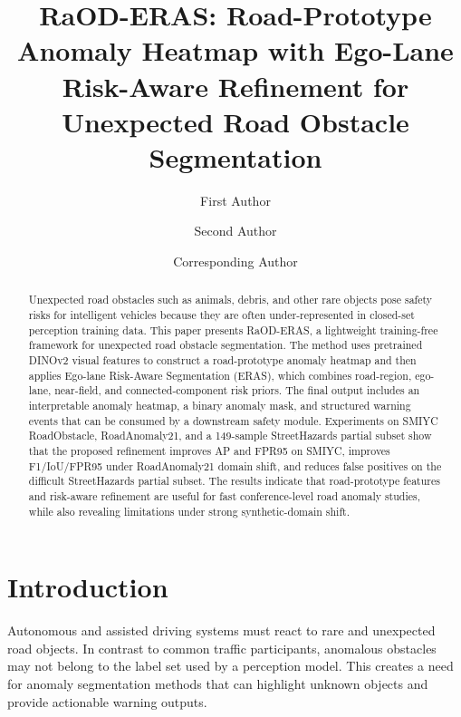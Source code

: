 \documentclass[runningheads]{llncs}
\begin{document}
\title{RaOD-ERAS: Road-Prototype Anomaly Heatmap with Ego-Lane Risk-Aware Refinement for Unexpected Road Obstacle Segmentation}

\author{First Author \and Second Author \and Corresponding Author}

\maketitle

\begin{abstract}
Unexpected road obstacles such as animals, debris, and other rare objects pose safety risks for intelligent vehicles because they are often under-represented in closed-set perception training data. This paper presents RaOD-ERAS, a lightweight training-free framework for unexpected road obstacle segmentation. The method uses pretrained DINOv2 visual features to construct a road-prototype anomaly heatmap and then applies Ego-lane Risk-Aware Segmentation (ERAS), which combines road-region, ego-lane, near-field, and connected-component risk priors. The final output includes an interpretable anomaly heatmap, a binary anomaly mask, and structured warning events that can be consumed by a downstream safety module. Experiments on SMIYC RoadObstacle, RoadAnomaly21, and a 149-sample StreetHazards partial subset show that the proposed refinement improves AP and FPR95 on SMIYC, improves F1/IoU/FPR95 under RoadAnomaly21 domain shift, and reduces false positives on the difficult StreetHazards partial subset. The results indicate that road-prototype features and risk-aware refinement are useful for fast conference-level road anomaly studies, while also revealing limitations under strong synthetic-domain shift.

\end{abstract}

\section{Introduction}

Autonomous and assisted driving systems must react to rare and unexpected road objects. In contrast to common traffic participants, anomalous obstacles may not belong to the label set used by a perception model. This creates a need for anomaly segmentation methods that can highlight unknown objects and provide actionable warning outputs.
\end{document}
